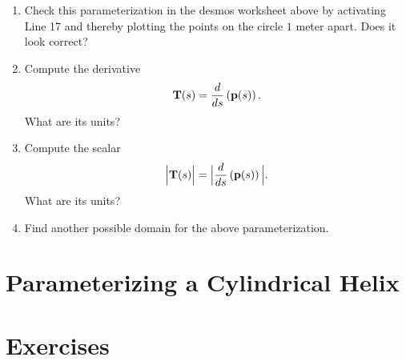\documentclass{ximera}
\begin{document}
\begin{question}
\begin{explanation}
\begin{enumerate}
\item Check this parameterization in the desmos worksheet above by activating Line 17 and thereby plotting the points on the circle $1$ meter apart. Does it look correct? %

\item Compute the derivative 
\[
     {\bf T}(s) = \frac{d}{ds}\left( {\bf p}(s) \right) . 
\]
What are its units?

\item Compute the scalar
\[
   \Big| {\bf T}(s) \Big|  = \Big|  \frac{d}{ds}\left( {\bf p}(s) \right) \Big| .
\]
What are its units? 

\item Find another possible domain for the above parameterization.

\begin{freeResponse}
\end{freeResponse}

\end{enumerate}


\end{explanation}
\end{question}



\section{Parameterizing a Cylindrical Helix}





\section{Exercises}
\end{document}
